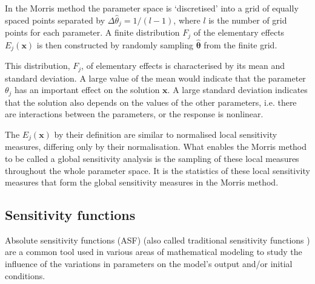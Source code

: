 \documentclass[a4paper, 12pt]{article}
\begin{document}
\smallskip

In the Morris method the parameter space is `discretised' into a grid of equally spaced points separated by $\Delta\hat{\theta}_j = 1 / \left( l - 1 \right)$, where $l$ is the number of grid points for each parameter. A finite distribution $F_j$ of the elementary effects $E_j(\mathbf{x})$ is then constructed by randomly sampling $\boldsymbol{\hat{\theta}}$ from the finite grid.

\smallskip

This distribution, $F_j$, of elementary effects is characterised by its mean and standard deviation. A large value of the mean would indicate that the parameter $\theta_j$ has an important effect on the solution $\mathbf{x}$. A large standard deviation indicates that the solution also depends on the values of the other parameters, i.e. there are interactions between the parameters, or the response is nonlinear.

\smallskip

The $E_j(\mathbf{x})$ by their definition are similar to normalised local sensitivity measures, differing only by their normalisation. What enables the Morris method to be called a global sensitivity analysis is the sampling of these local measures throughout the whole parameter space. It is the statistics of these local sensitivity measures that form the global sensitivity measures in the Morris method.

\subsection{Sensitivity functions}


\smallskip

Absolute sensitivity functions (ASF) (also called traditional  sensitivity functions \cite{Banks2007a, Banks2010}) are a common tool used in various areas of mathematical modeling \cite{Turanyi1990, Banks2005, Capaldi2012, MahStuOttOlu13, Mader2014} to study the influence of the variations in parameters on the model's output and/or initial conditions.

\smallskip
\end{document}
